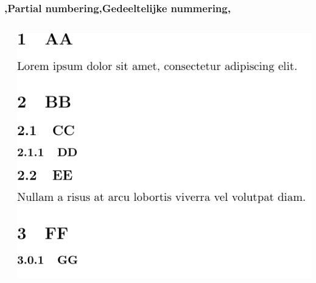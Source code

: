 \begin{frame}
    \frametitle{\lang,Partial numbering,Gedeeltelijke nummering,}
    
    \begin{columns}
        \begin{column}{0.5\textwidth}
        \end{column}
        \begin{column}{0.5\textwidth}
            \includegraphics[width=\linewidth,height=0.8\textheight,keepaspectratio]{assets/sectioncommands.pdf}
        \end{column}
    \end{columns}
\end{frame}

